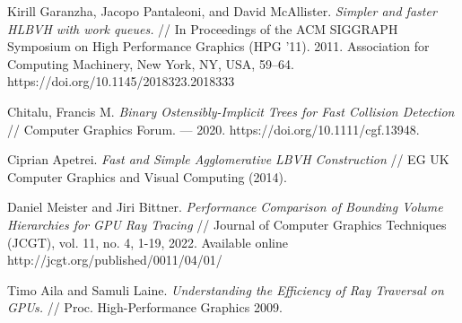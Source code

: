 \documentclass[11pt,fleqn,english,russian]{report} %
\begin{document}
\begin{thebibliography}{10}
	 Kirill Garanzha, Jacopo Pantaleoni, and David McAllister. \textit{Simpler and faster HLBVH with work queues.} // In Proceedings of the ACM SIGGRAPH Symposium on High Performance Graphics (HPG '11). 2011. Association for Computing Machinery, New York, NY, USA, 59–64. https://doi.org/10.1145/2018323.2018333
	
	 Chitalu, Francis M. \textit{Binary Ostensibly-Implicit Trees for Fast Collision Detection} // Computer Graphics Forum. — 2020. https://doi.org/10.1111/cgf.13948.
	
	 Ciprian Apetrei. \textit{Fast and Simple Agglomerative LBVH Construction} // EG UK Computer Graphics and Visual Computing (2014).
	
	 Daniel Meister and Jiri Bittner. \textit{Performance Comparison of Bounding Volume Hierarchies for GPU Ray Tracing} // Journal of Computer Graphics Techniques (JCGT), vol. 11, no. 4, 1-19, 2022. Available online http://jcgt.org/published/0011/04/01/
	
	 Timo Aila and Samuli Laine. \textit{Understanding the Efficiency of Ray Traversal on GPUs.} // Proc. High-Performance Graphics 2009.
	
	
\end{thebibliography}
\end{document}
